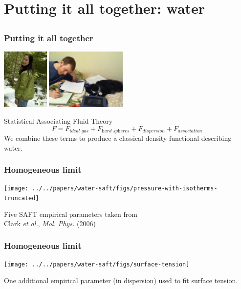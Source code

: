 \section{Putting it all together: water}

\subsection{}

\begin{frame}
  \frametitle{Putting it all together}
  \begin{center}
    \includegraphics[height=3cm]{figs/HughesJessica}
    \includegraphics[height=3cm]{figs/KrebsEric}
  \end{center}
  \begin{block}{Statistical Associating Fluid Theory}
    \[
    F = F_{\textit{ideal gas}} + F_{\textit{hard spheres}} + F_{\textit{dispersion}} + F_{\textit{association}}
    \]
    We combine these terms to produce a classical density functional
    describing water.
  \end{block}
\end{frame}

\begin{frame}
  \frametitle{Homogeneous limit}
  \begin{center}
    \vspace{-1em}
    \texttt{[image: ../../papers/water-saft/figs/pressure-with-isotherms-truncated]}
   \end{center}
  Five SAFT empirical parameters taken from\\\hfill Clark \emph{et al.}, \emph{Mol. Phys.}
  (2006)
\end{frame}

\begin{frame}
  \frametitle{Homogeneous limit}
  \begin{center}
    \vspace{-1em}
    \texttt{[image: ../../papers/water-saft/figs/surface-tension]}
  \end{center}
  \vspace{-1.5em}
  One additional empirical parameter (in dispersion) used to fit
  surface tension.
\end{frame}

